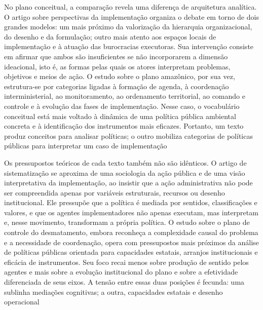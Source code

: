 \documentclass[12pt,a4paper]{article}
\begin{document}
No plano conceitual, a comparação revela uma diferença de arquitetura analítica. O artigo sobre perspectivas da implementação organiza o debate em torno de dois grandes modelos: um mais próximo da valorização da hierarquia organizacional, do desenho e da formulação; outro mais atento aos espaços locais de implementação e à atuação das burocracias executoras. Sua intervenção consiste em afirmar que ambos são insuficientes se não incorporarem a dimensão ideacional, isto é, as formas pelas quais os atores interpretam problemas, objetivos e meios de ação. O estudo sobre o plano amazônico, por sua vez, estrutura-se por categorias ligadas à formação de agenda, à coordenação interministerial, ao monitoramento, ao ordenamento territorial, ao comando e controle e à evolução das fases de implementação. Nesse caso, o vocabulário conceitual está mais voltado à dinâmica de uma política pública ambiental concreta e à identificação dos instrumentos mais eficazes. Portanto, um texto produz conceitos para analisar políticas; o outro mobiliza categorias de políticas públicas para interpretar um caso de implementação \parencite{ascenzi2013_implementacao_politicas,mello2017_evolucao_plano}

Os pressupostos teóricos de cada texto também não são idênticos. O artigo de sistematização se aproxima de uma sociologia da ação pública e de uma visão interpretativa da implementação, ao insistir que a ação administrativa não pode ser compreendida apenas por variáveis estruturais, recursos ou desenho institucional. Ele pressupõe que a política é mediada por sentidos, classificações e valores, e que os agentes implementadores não apenas executam, mas interpretam e, nesse movimento, transformam a própria política. O estudo sobre o plano de controle do desmatamento, embora reconheça a complexidade causal do problema e a necessidade de coordenação, opera com pressupostos mais próximos da análise de políticas públicas orientada para capacidades estatais, arranjos institucionais e eficácia de instrumentos. Seu foco recai menos sobre produção de sentido pelos agentes e mais sobre a evolução institucional do plano e sobre a efetividade diferenciada de seus eixos. A tensão entre essas duas posições é fecunda: uma sublinha mediações cognitivas; a outra, capacidades estatais e desenho operacional \parencite{ascenzi2013_implementacao_politicas,mello2017_evolucao_plano}
\end{document}
